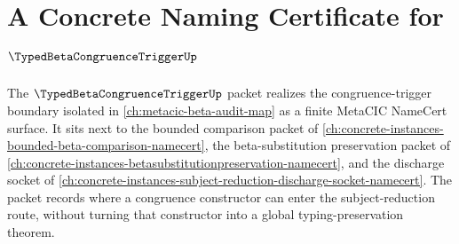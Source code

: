 \chapter{A Concrete Naming Certificate for $\TypedBetaCongruenceTriggerUp$}
\label{ch:concrete-instances-typedbetacongruencetrigger-namecert}

The $\TypedBetaCongruenceTriggerUp$ packet realizes the congruence-trigger boundary isolated in \autoref{ch:metacic-beta-audit-map} as a finite MetaCIC NameCert surface. It sits next to the bounded comparison packet of \autoref{ch:concrete-instances-bounded-beta-comparison-namecert}, the beta-substitution preservation packet of \autoref{ch:concrete-instances-betasubstitutionpreservation-namecert}, and the discharge socket of \autoref{ch:concrete-instances-subject-reduction-discharge-socket-namecert}. The packet records where a congruence constructor can enter the subject-reduction route, without turning that constructor into a global typing-preservation theorem.

